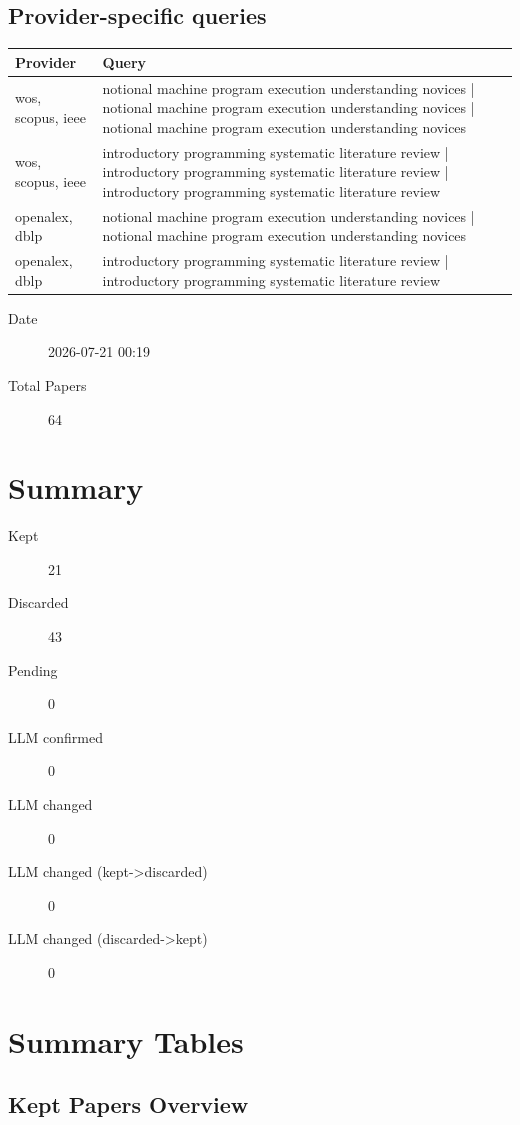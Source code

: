 \documentclass{article}
\begin{document}
\subsection{Provider-specific queries}
\begin{longtable}{lp{10cm}}
\toprule
Provider & Query \\
\midrule
wos, scopus, ieee & notional machine program execution understanding novices | notional machine program execution understanding novices | notional machine program execution understanding novices \\
wos, scopus, ieee & introductory programming systematic literature review | introductory programming systematic literature review | introductory programming systematic literature review \\
openalex, dblp & notional machine program execution understanding novices | notional machine program execution understanding novices \\
openalex, dblp & introductory programming systematic literature review | introductory programming systematic literature review \\
\bottomrule
\end{longtable}

\begin{description}
\item[Date] 2026-07-21 00:19
\item[Total Papers] 64
\end{description}

\section{Summary}
\begin{description}
\item[Kept] 21
\item[Discarded] 43
\item[Pending] 0
\item[LLM confirmed] 0
\item[LLM changed] 0
\item[LLM changed (kept->discarded)] 0
\item[LLM changed (discarded->kept)] 0
\end{description}

\section{Summary Tables}

\subsection{Kept Papers Overview}
\end{document}
